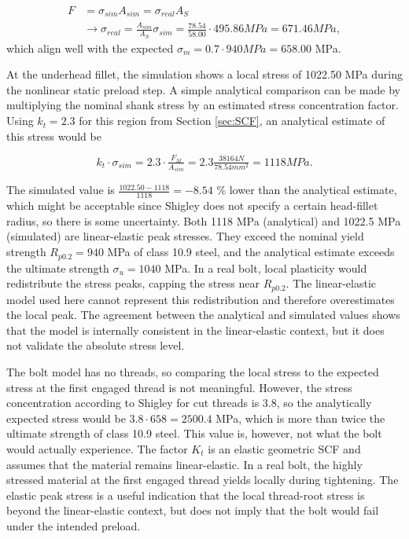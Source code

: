 \documentclass[a4paper,twoside]{bth}
\begin{document}
\begin{equation}
    \begin{aligned}
        F &= \sigma_{sim}A_{sim} = \sigma_{real}A_{S} \\
        &\rightarrow \sigma_{real} = \frac{A_{sim}}{A_S} \sigma_{sim} = \frac{78.54}{58.00}\cdot 495.86 MPa = 671.46 MPa,
    \end{aligned}
\end{equation}
which align well with the expected $\sigma_m = 0.7\cdot 940 MPa = 658.00$ MPa.

At the underhead fillet, the simulation shows a local stress of 1022.50 MPa during the nonlinear static preload step. A simple analytical comparison can be made by multiplying the nominal shank stress by an estimated stress concentration factor. Using $k_t = 2.3$ for this region from Section \ref{sec:SCF}, an analytical estimate of this stress would be

\begin{equation}
    k_t \cdot \sigma_{sim} = 2.3 \cdot \tfrac{F_M}{A_{sim}} = 2.3\tfrac{38164 N}{78.54 mm^2} = 1118 MPa.
\end{equation}

The simulated value is $\tfrac{1022.50 - 1118}{1118} = -8.54$ \% lower than the analytical estimate, which might be acceptable since Shigley does not specify a certain head-fillet radius, so there is some uncertainty. Both 1118 MPa (analytical) and 1022.5 MPa (simulated) are linear-elastic peak stresses. They exceed the nominal yield strength $R_{p0.2} = 940$ MPa of class 10.9 steel, and the analytical estimate exceeds the ultimate strength $\sigma_u = 1040$ MPa. In a real bolt, local plasticity would redistribute the stress peaks, capping the stress near $R_{p0.2}$. The linear-elastic model used here cannot represent this redistribution and therefore overestimates the local peak. The agreement between the analytical and simulated values shows that the model is internally consistent in the linear-elastic context, but it does not validate the absolute stress level. 


The bolt model has no threads, so comparing the local stress to the expected stress at the first engaged thread is not meaningful. However, the stress concentration according to Shigley for cut threads is 3.8, so the analytically expected stress would be $3.8\cdot 658 = 2500.4$ MPa, which is more than twice the ultimate strength of class 10.9 steel. This value is, however, not what the bolt would actually experience. The factor $K_t$ is an elastic geometric \ac{SCF} and assumes that the material remains linear-elastic. In a real bolt, the highly stressed material at the first engaged thread yields locally during tightening. The elastic peak stress is a useful indication that the local thread-root stress is beyond the linear-elastic context, but does not imply that the bolt would fail under the intended preload.
\end{document}
